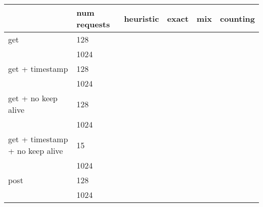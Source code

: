 \documentclass[a4paper]{report}
\begin{document}
\begin{table}[]
	\begin{tabular}{l l|l l l l}
		\hline
		                                & num requests & heuristic & exact & mix & counting \\ \hline
		get                             & 128          &           &       &     &          \\
		                                & 1024         &           &       &     &          \\ \hline
		get + timestamp                 & 128          &           &       &     &          \\
		                                & 1024         &           &       &     &          \\ \hline
		get + no keep alive             & 128          &           &       &     &          \\
		                                & 1024         &           &       &     &          \\ \hline
		get + timestamp + no keep alive & 15           &           &       &     &          \\
		                                & 1024         &           &       &     &          \\ \hline
		post                            & 128          &           &       &     &          \\
		                                & 1024         &           &       &     &          \\
	\end{tabular}
\end{table}
\end{document}
